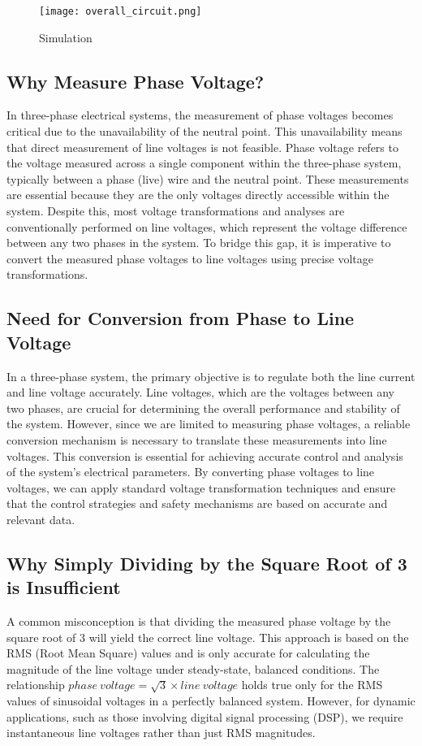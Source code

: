 \begin{figure}[ht]
    \centering
    \texttt{[image: overall\_circuit.png]}
    \caption{Simulation}
    \label{fig:Simulation}
\end{figure}

\subsection{Why Measure Phase Voltage?}
In three-phase electrical systems, the measurement of phase voltages becomes
critical due to the unavailability of the neutral point. This unavailability
means that direct measurement of line voltages is not feasible. Phase voltage
refers to the voltage measured across a single component within the three-phase
system, typically between a phase (live) wire and the neutral point. These
measurements are essential because they are the only voltages directly
accessible within the system. Despite this, most voltage transformations and
analyses are conventionally performed on line voltages, which represent the
voltage difference between any two phases in the system. To bridge this gap, it
is imperative to convert the measured phase voltages to line voltages using
precise voltage transformations.

\subsection{Need for Conversion from Phase to Line Voltage}
In a three-phase system, the primary objective is to regulate both the line
current and line voltage accurately. Line voltages, which are the voltages
between any two phases, are crucial for determining the overall performance and
stability of the system. However, since we are limited to measuring phase
voltages, a reliable conversion mechanism is necessary to translate these
measurements into line voltages. This conversion is essential for achieving
accurate control and analysis of the system's electrical parameters. By
converting phase voltages to line voltages, we can apply standard voltage
transformation techniques and ensure that the control strategies and safety
mechanisms are based on accurate and relevant data.

\subsection{Why Simply Dividing by the Square Root of 3 is Insufficient}
A common misconception is that dividing the measured phase voltage by the
square root of 3 will yield the correct line voltage. This approach is based on
the RMS (Root Mean Square) values and is only accurate for calculating the
magnitude of the line voltage under steady-state, balanced conditions. The
relationship \(phase\ voltage = \sqrt{3} \times line\ voltage\) holds true only
for the RMS values of sinusoidal voltages in a perfectly balanced system.
However, for dynamic applications, such as those involving digital signal
processing (DSP), we require instantaneous line voltages rather than just RMS
magnitudes.


